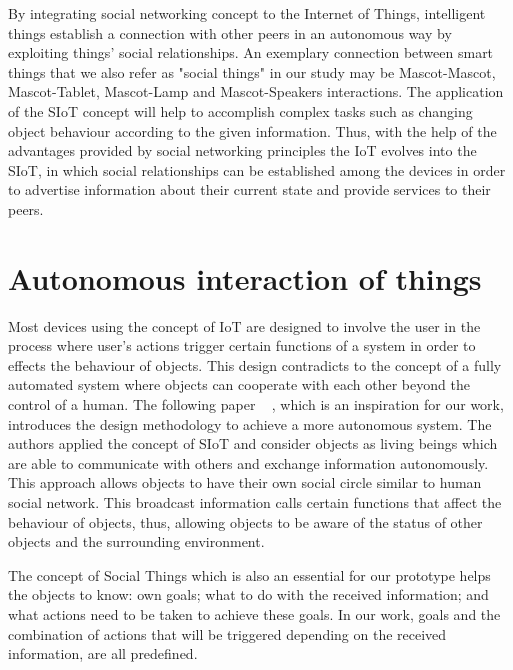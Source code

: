 \par By integrating social networking concept to the Internet of Things, intelligent things establish a connection with other peers in an autonomous way by exploiting things' social relationships. An exemplary connection between smart things that we also refer as "social things" in our study may be Mascot-Mascot, Mascot-Tablet, Mascot-Lamp and Mascot-Speakers interactions. The application of the SIoT concept will help to accomplish complex tasks such as changing object behaviour according to the given information. Thus, with the help of the advantages provided by social networking principles the IoT evolves into the SIoT, in which social relationships can be established among the devices in order to advertise information about their current state and provide services to their peers.

\section{Autonomous interaction of things}
\label{sec:Autonomous interaction of things}
Most devices using the concept of IoT are designed to involve the user in the process where user's actions trigger certain functions of a system in order to effects the behaviour of objects. This design contradicts to the concept of a fully automated system where objects can cooperate with each other beyond the control of a human. The following paper ~\cite{okada2016autonomous} , which is an inspiration for our work, introduces the design methodology to achieve a more autonomous system. The authors applied the concept of SIoT and consider objects as living beings which are able to communicate with others and exchange information autonomously. This approach allows objects to have their own social circle similar to human social network. This broadcast information calls certain functions that affect the behaviour of objects, thus, allowing objects to be aware of the status of other objects and the surrounding environment.

\par The concept of Social Things which is also an essential for our prototype helps the objects to know: own goals; what to do with the received information; and what actions need to be taken to achieve these goals. In our work, goals and the combination of actions that will be triggered depending on the received information, are all predefined.

